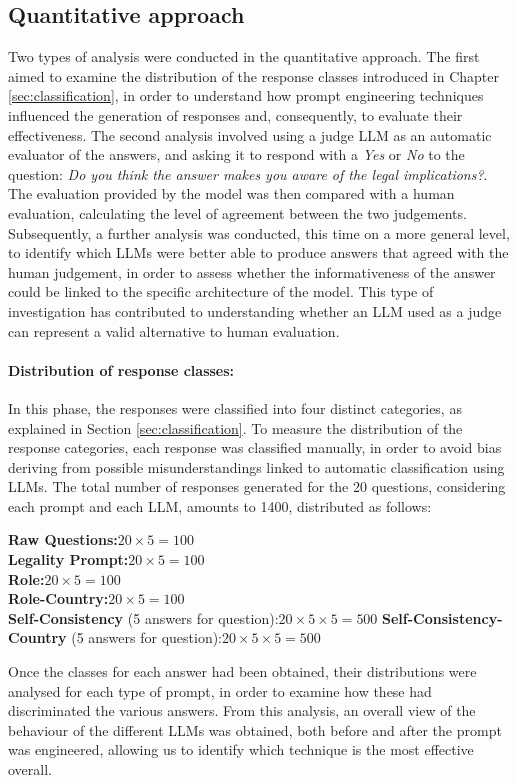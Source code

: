 \subsection{Quantitative approach}
Two types of analysis were conducted in the quantitative approach. The first aimed to examine the distribution of the response classes introduced in Chapter \ref{sec:classification}, in order to understand how prompt engineering techniques influenced the generation of responses and, consequently, to evaluate their effectiveness. 
The second analysis involved using a judge LLM as an automatic evaluator of the answers, and asking it to respond with a \textit{Yes} or \textit{No} to the question: \textit{Do you think the answer makes you aware of the legal implications?}. The evaluation provided by the model was then compared with a human evaluation, calculating the level of agreement between the two judgements. Subsequently, a further analysis was conducted, this time on a more general level, to identify which LLMs were better able to produce answers that agreed with the human judgement, in order to assess whether the informativeness of the answer could be linked to the specific architecture of the model. This type of investigation has contributed to understanding whether an LLM used as a judge can represent a valid alternative to human evaluation.
\paragraph{Distribution of response classes:}
\noindent In this phase, the responses were classified into four distinct categories, as explained in Section \ref{sec:classification}. To measure the distribution of the response categories, each response was classified manually, in order to avoid bias deriving from possible misunderstandings linked to automatic classification using LLMs. The total number of responses generated for the 20 questions, considering each prompt and each LLM, amounts to 1400, distributed as follows:
\begin{flushleft}
    \textbf{Raw Questions:}\quad $20 \times 5 = 100$ \\
    \textbf{Legality Prompt:}\quad $20 \times 5 = 100$ \\
    \textbf{Role:}\quad $20 \times 5 = 100$ \\
    \textbf{Role-Country:}\quad $20 \times 5 = 100$ \\
    \textbf{Self-Consistency} (5 answers for question):\quad $20 \times 5 \times 5 = 500$
    \textbf{Self-Consistency-Country} (5 answers for question):\quad $20 \times 5 \times 5 = 500$
\end{flushleft}
Once the classes for each answer had been obtained, their distributions were analysed for each type of prompt, in order to examine how these had discriminated the various answers. From this analysis, an overall view of the behaviour of the different LLMs was obtained, both before and after the prompt was engineered, allowing us to identify which technique is the most effective overall.
